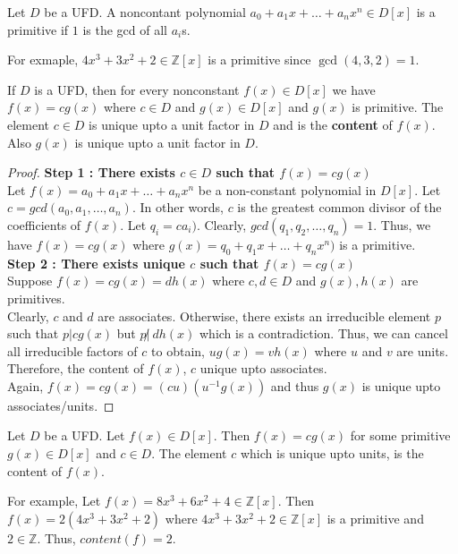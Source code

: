\begin{definition}[primitive]
	Let $D$ be a UFD.
	A noncontant polynomial $a_0 + a_1x + \dots + a_nx^n \in D[x]$ is a primitive if $1$ is the gcd of all $a_i$s.
\end{definition}
	For exmaple, $4x^3+3x^2+2 \in \mathbb{Z}[x]$ is a primitive since $\gcd(4,3,2) = 1$.

\begin{lemma}
	If $D$ is a UFD, then for every nonconstant $f(x) \in D[x]$ we have $f(x) = cg(x)$ where $c \in D$ and $g(x) \in D[x]$ and $g(x)$ is primitive.
	The element $c \in D$ is unique upto a unit factor in $D$ and is the \textbf{content} of $f(x)$.
	Also $g(x)$ is unique upto a unit factor in $D$.
\end{lemma}
\begin{proof}
	\textbf{Step 1 : There exists $c \in D$ such that $f(x) = cg(x)$}\\
	Let $f(x) = a_0 + a_1x + \dots +a_nx^n$ be a non-constant polynomial in $D[x]$.
	Let $c = gcd(a_0,a_1,\dots,a_n)$.
	In other words, $c$ is the greatest common divisor of the coefficients of $f(x)$.
	Let $q_i = ca_i)$.
	Clearly, $gcd(q_1,q_2,\dots,q_n) = 1$.
	Thus, we have $f(x) = cg(x)$ where $g(x) = q_0+q_1x+\dots+q_nx^n)$ is a primitive.\\

	\textbf{Step 2 : There exists unique $c$ such that  $f(x) = cg(x)$}\\
	Suppose $f(x) = cg(x) = dh(x)$ where $c,d \in D$ and $g(x), h(x)$ are primitives.\\

	Clearly, $c$ and $d$ are associates.
	Otherwise, there exists an irreducible element $p$ such that $p | cg(x)$ but $p\!\not|\ dh(x)$ which is a contradiction.
	Thus, we can cancel all irreducible factors of $c$ to obtain, $ug(x) = vh(x)$ where $u$ and $v$ are units.
	Therefore, the content of $f(x)$, $c$ unique upto associates.\\

	Again, $f(x) = cg(x) = (cu) (u^{-1}g(x))$ and thus $g(x)$ is unique upto associates/units.
\end{proof}

\begin{definition}[content]
	Let $D$ be a UFD.
	Let $f(x) \in D[x]$.
	Then $f(x) = cg(x)$ for some primitive $g(x) \in D[x]$ and $c \in D$.
	The element $c$ which is unique upto units, is the content of $f(x)$.
\end{definition}
	For example, Let $f(x) = 8x^3+6x^2+4 \in \mathbb{Z}[x]$.
	Then $f(x) = 2(4x^3+3x^2+2)$ where $4x^3+3x^2+2 \in \mathbb{Z}[x]$ is a primitive and $2 \in \mathbb{Z}$.
	Thus, $content(f) = 2$.


